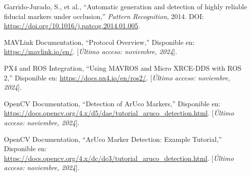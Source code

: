 \begin{thebibliography}{30}
    Garrido-Jurado, S., et al., ``Automatic generation and detection of highly reliable fiducial markers under occlusion,'' \textit{Pattern Recognition}, 2014. DOI: \url{https://doi.org/10.1016/j.patcog.2014.01.005}.

    MAVLink Documentation, ``Protocol Overview,'' Disponible en: \url{https://mavlink.io/en/}. [\textit{Último acceso: noviembre, 2024}].

    PX4 and ROS Integration, ``Using MAVROS and Micro XRCE-DDS with ROS 2,'' Disponible en: \url{https://docs.px4.io/en/ros2/}. [\textit{Último acceso: noviembre, 2024}].

    OpenCV Documentation, ``Detection of ArUco Markers,'' Disponible en: \url{https://docs.opencv.org/4.x/d5/dae/tutorial_aruco_detection.html}. [\textit{Último acceso: noviembre, 2024}].

    OpenCV Documentation, ``ArUco Marker Detection: Example Tutorial,'' Disponible en: \url{https://docs.opencv.org/4.x/dc/dc3/tutorial_aruco_detection.html}. [\textit{Último acceso: noviembre, 2024}].


\end{thebibliography}

